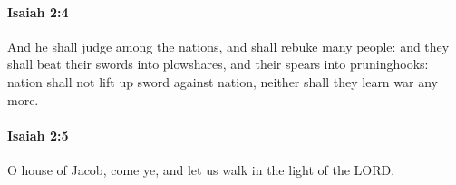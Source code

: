 		\paragraph{Isaiah 2:4} %
			\label{ISAIAH-2-4}

			And he shall judge among the nations, and shall rebuke many people: and they shall beat their swords into plowshares, and their spears into pruninghooks: nation shall not lift up sword against nation, neither shall they learn war any more.


		\paragraph{Isaiah 2:5} %
			\label{ISAIAH-2-5}

			O house of Jacob, come ye, and let us walk in the light of the LORD.



